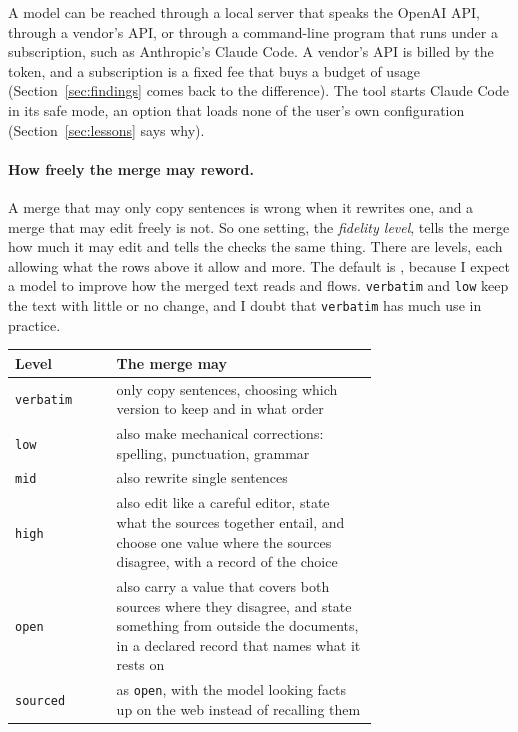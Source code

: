 A model can be reached through a local server that speaks the OpenAI API, through a vendor's API, or through a command-line program that runs under a subscription, such as Anthropic's Claude Code. A vendor's API is billed by the token, and a subscription is a fixed fee that buys a budget of usage (Section~\ref{sec:findings} comes back to the difference). The tool starts Claude Code in its safe mode, an option that loads none of the user's own configuration (Section~\ref{sec:lessons} says why).

\paragraph{How freely the merge may reword.} A merge that may only copy sentences is wrong when it rewrites one, and a merge that may edit freely is not. So one setting, the \emph{fidelity level}, tells the merge how much it may edit and tells the checks the same thing. There are  levels, each allowing what the rows above it allow and more. The default is \texttt{}, because I expect a model to improve how the merged text reads and flows. \texttt{verbatim} and \texttt{low} keep the text with little or no change, and I doubt that \texttt{verbatim} has much use in practice.

\begin{center}\small
\begin{tabular}{@{}lp{0.72\linewidth}@{}}
\toprule
Level & The merge may \\
\midrule
\texttt{verbatim} & only copy sentences, choosing which version to keep and in what order \\
\texttt{low} & also make mechanical corrections: spelling, punctuation, grammar \\
\texttt{mid} & also rewrite single sentences \\
\texttt{high} & also edit like a careful editor, state what the sources together entail, and choose one value where the sources disagree, with a record of the choice \\
\texttt{open} & also carry a value that covers both sources where they disagree, and state something from outside the documents, in a declared record that names what it rests on \\
\texttt{sourced} & as \texttt{open}, with the model looking facts up on the web instead of recalling them \\
\bottomrule
\end{tabular}
\end{center}

